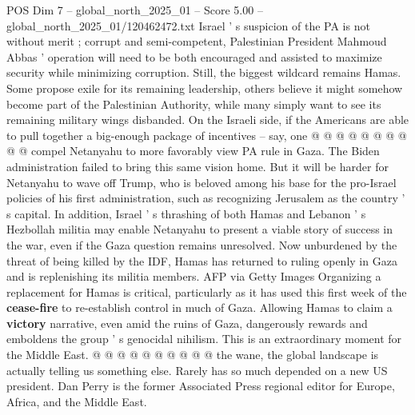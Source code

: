 \begin{textsample}{POS Dim 7 – global\_north\_2025\_01 – Score 5.00 – global\_north\_2025\_01/120462472.txt}
Israel ' s suspicion of the PA is not without merit ; corrupt and semi-competent, Palestinian President Mahmoud Abbas ' operation will need to be both encouraged and assisted to maximize security while minimizing corruption.
Still, the biggest wildcard remains Hamas.
Some propose exile for its remaining leadership, others believe it might somehow become part of the Palestinian Authority, while many simply want to see its remaining military wings disbanded.
On the Israeli side, if the Americans are able to pull together a big-enough package of incentives -- say, one @ @ @ @ @ @ @ @ @ @ compel Netanyahu to more favorably view PA rule in Gaza.
The Biden administration failed to bring this same vision home.
But it will be harder for Netanyahu to wave off Trump, who is beloved among his base for the pro-Israel policies of his first administration, such as recognizing Jerusalem as the country ' s capital.
In addition, Israel ' s thrashing of both Hamas and Lebanon ' s Hezbollah militia may enable Netanyahu to present a viable story of success in the war, even if the Gaza question remains unresolved.
Now unburdened by the threat of being killed by the IDF, Hamas has returned to ruling openly in Gaza and is replenishing its militia members.
AFP via Getty Images Organizing a replacement for Hamas is critical, particularly as it has used this first week of the \textbf{cease-fire} to re-establish control in much of Gaza.
Allowing Hamas to claim a \textbf{victory} narrative, even amid the ruins of Gaza, dangerously rewards and emboldens the group ' s genocidal nihilism.
This is an extraordinary moment for the Middle East. @ @ @ @ @ @ @ @ @ @ the wane, the global landscape is actually telling us something else.
Rarely has so much depended on a new US president.
Dan Perry is the former Associated Press regional editor for Europe, Africa, and the Middle East.

\end{textsample}
